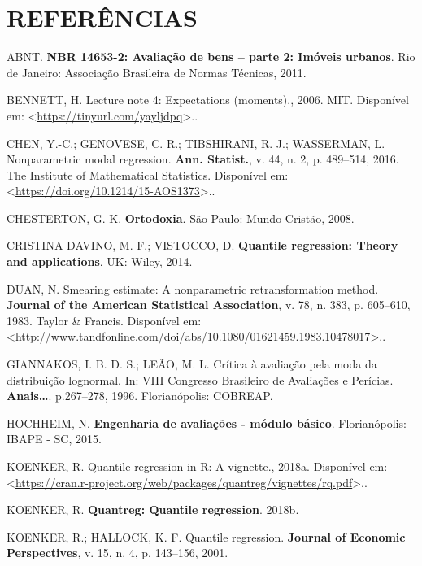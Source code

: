 \documentclass[a4paper, 12pt]{article}
\begin{document}
\section*{REFERÊNCIAS}\label{referencias}

\hypertarget{refs}{}
\hypertarget{ref-NBR1465302}{}
ABNT. \textbf{NBR 14653-2: Avaliação de bens -- parte 2: Imóveis
urbanos}. Rio de Janeiro: Associação Brasileira de Normas Técnicas,
2011.

\hypertarget{ref-bennett}{}
BENNETT, H. Lecture note 4: Expectations (moments)., 2006. MIT.
Disponível em:
\textless{}\url{https://tinyurl.com/yayljdpq}\textgreater{}..

\hypertarget{ref-chen2016}{}
CHEN, Y.-C.; GENOVESE, C. R.; TIBSHIRANI, R. J.; WASSERMAN, L.
Nonparametric modal regression. \textbf{Ann. Statist.}, v. 44, n. 2, p.
489--514, 2016. The Institute of Mathematical Statistics. Disponível em:
\textless{}\url{https://doi.org/10.1214/15-AOS1373}\textgreater{}..

\hypertarget{ref-gkchesterton}{}
CHESTERTON, G. K. \textbf{Ortodoxia}. São Paulo: Mundo Cristão, 2008.

\hypertarget{ref-QR}{}
CRISTINA DAVINO, M. F.; VISTOCCO, D. \textbf{Quantile regression: Theory
and applications}. UK: Wiley, 2014.

\hypertarget{ref-Duan}{}
DUAN, N. Smearing estimate: A nonparametric retransformation method.
\textbf{Journal of the American Statistical Association}, v. 78, n. 383,
p. 605--610, 1983. Taylor \& Francis. Disponível em:
\textless{}\url{http://www.tandfonline.com/doi/abs/10.1080/01621459.1983.10478017}\textgreater{}..

\hypertarget{ref-giannakos}{}
GIANNAKOS, I. B. D. S.; LEÃO, M. L. Crítica à avaliação pela moda da
distribuição lognormal. In: VIII Congresso Brasileiro de Avaliações e
Perícias. \textbf{Anais\ldots{}}. p.267--278, 1996. Florianópolis:
COBREAP.

\hypertarget{ref-hochheim}{}
HOCHHEIM, N. \textbf{Engenharia de avaliações - módulo básico}.
Florianópolis: IBAPE - SC, 2015.

\hypertarget{ref-quantregvignette}{}
KOENKER, R. Quantile regression in R: A vignette., 2018a. Disponível em:
\textless{}\url{https://cran.r-project.org/web/packages/quantreg/vignettes/rq.pdf}\textgreater{}..

\hypertarget{ref-quantreg}{}
KOENKER, R. \textbf{Quantreg: Quantile regression}. 2018b.

\hypertarget{ref-koenker}{}
KOENKER, R.; HALLOCK, K. F. Quantile regression. \textbf{Journal of
Economic Perspectives}, v. 15, n. 4, p. 143--156, 2001.
\end{document}
